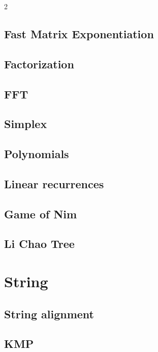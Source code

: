 \documentclass[10pt, a4paper]{article}
\begin{document}
\begin{landscape}
\begin{multicols}{2}
\subsection{Fast Matrix Exponentiation}
\raggedbottom
\subsection{Factorization}
\raggedbottom
\subsection{FFT}
\raggedbottom
\subsection{Simplex}
\raggedbottom
\subsection{Polynomials}
\raggedbottom
\subsection{Linear recurrences}
\raggedbottom
\subsection{Game of Nim}
\raggedbottom
\subsection{Li Chao Tree}
\raggedbottom


\section{String}
\subsection{String alignment}
\raggedbottom
\subsection{KMP}
\raggedbottom

\end{multicols}
\end{landscape}
\end{document}
